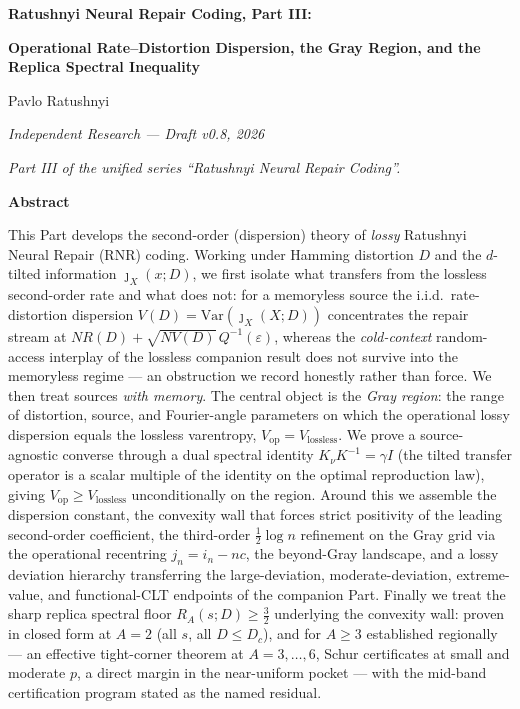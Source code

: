\documentclass[
]{article}
\author{}
\date{}
\begin{document}
\textbf{Ratushnyi Neural Repair Coding, Part III:}

\textbf{Operational Rate--Distortion Dispersion, the Gray Region, and the
Replica Spectral Inequality}

Pavlo Ratushnyi

\emph{Independent Research --- Draft v0.8, 2026}

\emph{Part III of the unified series ``Ratushnyi Neural Repair Coding''.}

\textbf{Abstract}

This Part develops the second-order (dispersion) theory of \emph{lossy}
Ratushnyi Neural Repair (RNR) coding. Working under Hamming distortion $D$
and the $d$-tilted information $\jmath_X(x;D)$, we first isolate what
transfers from the lossless second-order rate and what does not: for a
memoryless source the i.i.d.\ rate-distortion dispersion $V(D)=
\mathrm{Var}(\jmath_X(X;D))$ concentrates the repair stream at
$NR(D)+\sqrt{NV(D)}\,Q^{-1}(\varepsilon)$, whereas the \emph{cold-context}
random-access interplay of the lossless companion result does not survive
into the memoryless regime --- an obstruction we record honestly rather than
force. We then treat sources \emph{with memory}. The central object is the
\emph{Gray region}: the range of distortion, source, and Fourier-angle
parameters on which the operational lossy dispersion equals the lossless
varentropy, $V_{\mathrm{op}}=V_{\mathrm{lossless}}$. We prove a
source-agnostic converse through a dual spectral identity
$K_\nu K^{-1}=\gamma I$ (the tilted transfer operator is a scalar multiple
of the identity on the optimal reproduction law), giving
$V_{\mathrm{op}}\ge V_{\mathrm{lossless}}$ unconditionally on the region.
Around this we assemble the dispersion constant, the convexity wall that
forces strict positivity of the leading second-order coefficient, the
third-order $\tfrac12\log n$ refinement on the Gray grid via the operational
recentring $j_n=i_n-nc$, the beyond-Gray landscape, and a lossy deviation
hierarchy transferring the large-deviation, moderate-deviation,
extreme-value, and functional-CLT endpoints of the companion Part. Finally
we treat the sharp replica spectral floor $R_A(s;D)\ge\tfrac32$ underlying
the convexity wall: proven in closed form at $A=2$ (all $s$, all
$D\le D_c$), and for $A\ge3$ established regionally --- an effective
tight-corner theorem at $A=3,\dots,6$, Schur certificates at small and
moderate $p$, a direct margin in the near-uniform pocket --- with the
mid-band certification program stated as the named residual.
\end{document}
